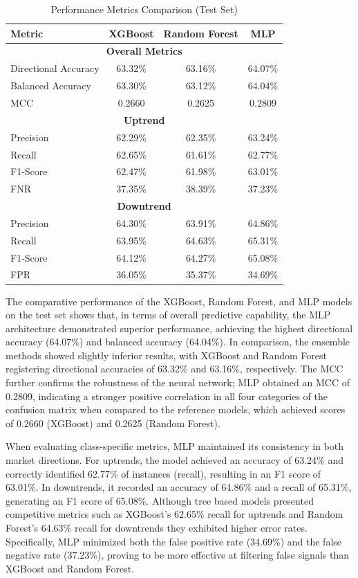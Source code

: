 \documentclass{ieeeaccess}
\begin{document}
\begin{table}
\centering
\caption{Performance Metrics Comparison (Test Set)}
\label{tab:performance_test_all}
\renewcommand{\arraystretch}{1.2} %
\begin{tabular}{|l|c|c|c|}
\hline
\textbf{Metric} & \textbf{XGBoost} & \textbf{Random Forest} & \textbf{MLP} \\
\hline
\multicolumn{4}{|c|}{\textbf{Overall Metrics}} \\
\hline
Directional Accuracy & 63.32\% & 63.16\% & 64.07\% \\
Balanced Accuracy    & 63.30\% & 63.12\% & 64.04\% \\
MCC & 0.2660 & 0.2625 & 0.2809 \\
\hline
\multicolumn{4}{|c|}{\textbf{Uptrend}} \\
\hline
Precision & 62.29\% & 62.35\% & 63.24\% \\
Recall    & 62.65\% & 61.61\% & 62.77\% \\
F1-Score  & 62.47\% & 61.98\% & 63.01\% \\
FNR       & 37.35\% & 38.39\% & 37.23\% \\
\hline
\multicolumn{4}{|c|}{\textbf{Downtrend}} \\
\hline
Precision & 64.30\% & 63.91\% & 64.86\% \\
Recall    & 63.95\% & 64.63\% & 65.31\% \\
F1-Score  & 64.12\% & 64.27\% & 65.08\% \\
FPR       & 36.05\% & 35.37\% & 34.69\% \\
\hline
\end{tabular}
\end{table}

The comparative performance of the XGBoost, Random Forest, and MLP models on the test set shows that, in terms of overall predictive capability, the MLP architecture demonstrated superior performance, achieving the highest directional accuracy (64.07\%) and balanced accuracy (64.04\%). In comparison, the ensemble methods showed slightly inferior results, with XGBoost and Random Forest registering directional accuracies of 63.32\% and 63.16\%, respectively. The MCC further confirms the robustness of the neural network; MLP obtained an MCC of 0.2809, indicating a stronger positive correlation in all four categories of the confusion matrix when compared to the reference models, which achieved scores of 0.2660 (XGBoost) and 0.2625 (Random Forest).

When evaluating class-specific metrics, MLP maintained its consistency in both market directions. For uptrends, the model achieved an accuracy of 63.24\% and correctly identified 62.77\% of instances (recall), resulting in an F1 score of 63.01\%. In downtrends, it recorded an accuracy of 64.86\% and a recall of 65.31\%, generating an F1 score of 65.08\%. Although tree based models presented competitive metrics such as XGBoost's 62.65\% recall for uptrends and Random Forest's 64.63\% recall for downtrends they exhibited higher error rates. Specifically, MLP minimized both the false positive rate (34.69\%) and the false negative rate (37.23\%), proving to be more effective at filtering false signals than XGBoost and Random Forest.
\end{document}
